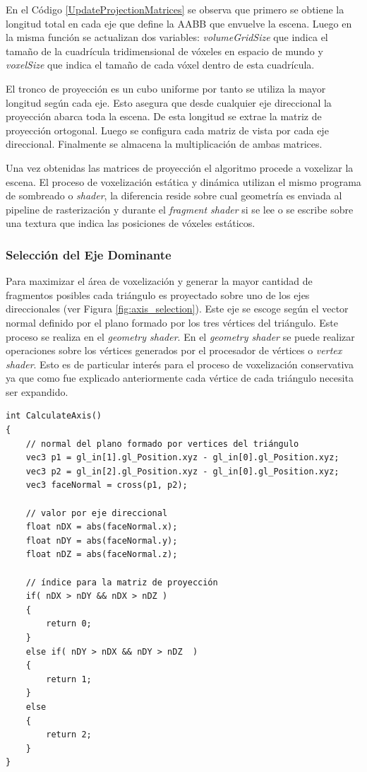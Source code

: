 En el Código \ref{UpdateProjectionMatrices} se observa que primero se obtiene la longitud total en cada eje que define la \ac{AABB} que envuelve la escena. Luego en la misma función se actualizan dos variables: \emph{volumeGridSize} que indica el tamaño de la cuadrícula tridimensional de vóxeles en espacio de mundo y \emph{voxelSize} que indica el tamaño de cada vóxel dentro de esta cuadrícula. 

El tronco de proyección es un cubo uniforme por tanto se utiliza la mayor longitud según cada eje. Esto asegura que desde cualquier eje direccional la proyección abarca toda la escena. De esta longitud se extrae la matriz de proyección ortogonal. Luego se configura cada matriz de vista por cada eje direccional. Finalmente se almacena la multiplicación de ambas matrices.

Una vez obtenidas las matrices de proyección el algoritmo procede a voxelizar la escena. El proceso de voxelización estática y dinámica utilizan el mismo programa de sombreado o \emph{shader}, la diferencia reside sobre cual geometría es enviada al pipeline de rasterización y durante el \emph{fragment shader} si se lee o se escribe sobre una textura que indica las posiciones de vóxeles estáticos.

\subsubsection{Selección del Eje Dominante}
Para maximizar el área de voxelización y generar la mayor cantidad de fragmentos posibles cada triángulo es proyectado sobre uno de los ejes direccionales (ver Figura \ref{fig:axis_selection}). Este eje se escoge según el vector normal definido por el plano formado por los tres vértices del triángulo. Este proceso se realiza en el \emph{geometry shader}. En el \emph{geometry shader} se puede realizar operaciones sobre los vértices generados por el procesador de vértices o \emph{vertex shader}. Esto es de particular interés para el proceso de voxelización conservativa ya que como fue explicado anteriormente cada vértice de cada triángulo necesita ser expandido.
\\
\begin{lstlisting}[caption={Selección del eje dominante para la proyección ortogonal.}, label=CalculateAxis]
int CalculateAxis()
{
    // normal del plano formado por vertices del triángulo
    vec3 p1 = gl_in[1].gl_Position.xyz - gl_in[0].gl_Position.xyz;
    vec3 p2 = gl_in[2].gl_Position.xyz - gl_in[0].gl_Position.xyz;
    vec3 faceNormal = cross(p1, p2);

    // valor por eje direccional
    float nDX = abs(faceNormal.x);
    float nDY = abs(faceNormal.y);
    float nDZ = abs(faceNormal.z);

    // índice para la matriz de proyección
    if( nDX > nDY && nDX > nDZ )
    {
        return 0;
    }
    else if( nDY > nDX && nDY > nDZ  )
    {
        return 1;
    }
    else
    {
        return 2;
    }
}
\end{lstlisting}


